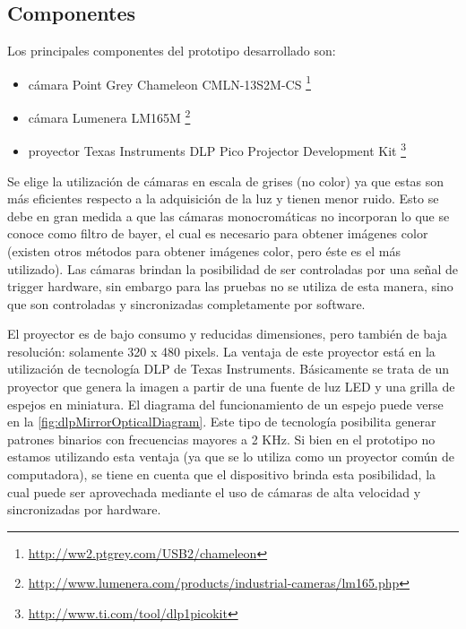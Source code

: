\subsection{Componentes}
Los principales componentes del prototipo desarrollado son:

\begin{itemize}
    \item cámara Point Grey Chameleon CMLN-13S2M-CS \footnote{\url{http://ww2.ptgrey.com/USB2/chameleon}}
    \item cámara Lumenera LM165M \footnote{\url{http://www.lumenera.com/products/industrial-cameras/lm165.php}}
    \item proyector Texas Instruments DLP Pico Projector Development Kit \footnote{\url{http://www.ti.com/tool/dlp1picokit}}
\end{itemize}

Se elige la utilización de cámaras en escala de grises (no color) ya que estas son más eficientes respecto a la adquisición de la luz y tienen menor ruido. Esto se debe en gran medida a que las cámaras monocromáticas no incorporan lo que se conoce como filtro de bayer, el cual es necesario para obtener imágenes color (existen otros métodos para obtener imágenes color, pero éste es el más utilizado). Las cámaras brindan la posibilidad de ser controladas por una señal de trigger hardware, sin embargo para las pruebas no se utiliza de esta manera, sino que son controladas y sincronizadas completamente por software.

El proyector es de bajo consumo y reducidas dimensiones, pero también de baja resolución: solamente 320 x 480 pixels. La ventaja de este proyector está en la utilización de tecnología DLP de Texas Instruments. Básicamente se trata de un proyector que genera la imagen a partir de una fuente de luz LED y una grilla de espejos en miniatura. El diagrama del funcionamiento de un espejo puede verse en la \autoref{fig:dlpMirrorOpticalDiagram}. Este tipo de tecnología posibilita generar patrones binarios con frecuencias mayores a 2 KHz. Si bien en el prototipo no estamos utilizando esta ventaja (ya que se lo utiliza como un proyector común de computadora), se tiene en cuenta que el dispositivo brinda esta posibilidad, la cual puede ser aprovechada mediante el uso de cámaras de alta velocidad y sincronizadas por hardware.

